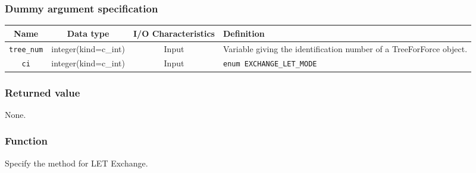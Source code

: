 \subsubsection*{Dummy argument specification}
\begin{table}[h]
\begin{tabularx}{\linewidth}{cccX}
\toprule
\rowcolor{Snow2}
Name & Data type & I/O Characteristics & Definition \\
\midrule
\texttt{tree\_num} & integer(kind=c\_int) & Input &  Variable giving the identification number of a TreeForForce object.\\
\texttt{ci} & integer(kind=c\_int) & Input & {\tt enum
  EXCHANGE\_LET\_MODE} \\
\bottomrule
\end{tabularx}
\end{table}

\subsubsection*{Returned value}
None.

\subsubsection*{Function}

Specify the method for LET Exchange.


\clearpage
